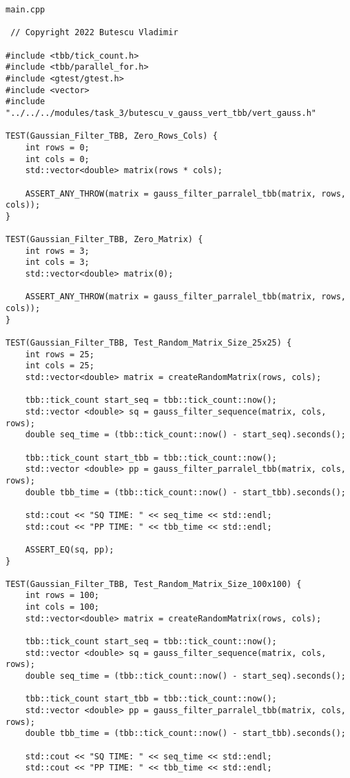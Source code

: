 \documentclass{report}
\begin{document}
\begin{lstlisting}
main.cpp

 // Copyright 2022 Butescu Vladimir

#include <tbb/tick_count.h>
#include <tbb/parallel_for.h>
#include <gtest/gtest.h>
#include <vector>
#include "../../../modules/task_3/butescu_v_gauss_vert_tbb/vert_gauss.h"

TEST(Gaussian_Filter_TBB, Zero_Rows_Cols) {
    int rows = 0;
    int cols = 0;
    std::vector<double> matrix(rows * cols);

    ASSERT_ANY_THROW(matrix = gauss_filter_parralel_tbb(matrix, rows, cols));
}

TEST(Gaussian_Filter_TBB, Zero_Matrix) {
    int rows = 3;
    int cols = 3;
    std::vector<double> matrix(0);

    ASSERT_ANY_THROW(matrix = gauss_filter_parralel_tbb(matrix, rows, cols));
}

TEST(Gaussian_Filter_TBB, Test_Random_Matrix_Size_25x25) {
    int rows = 25;
    int cols = 25;
    std::vector<double> matrix = createRandomMatrix(rows, cols);

    tbb::tick_count start_seq = tbb::tick_count::now();
    std::vector <double> sq = gauss_filter_sequence(matrix, cols, rows);
    double seq_time = (tbb::tick_count::now() - start_seq).seconds();

    tbb::tick_count start_tbb = tbb::tick_count::now();
    std::vector <double> pp = gauss_filter_parralel_tbb(matrix, cols, rows);
    double tbb_time = (tbb::tick_count::now() - start_tbb).seconds();

    std::cout << "SQ TIME: " << seq_time << std::endl;
    std::cout << "PP TIME: " << tbb_time << std::endl;

    ASSERT_EQ(sq, pp);
}

TEST(Gaussian_Filter_TBB, Test_Random_Matrix_Size_100x100) {
    int rows = 100;
    int cols = 100;
    std::vector<double> matrix = createRandomMatrix(rows, cols);

    tbb::tick_count start_seq = tbb::tick_count::now();
    std::vector <double> sq = gauss_filter_sequence(matrix, cols, rows);
    double seq_time = (tbb::tick_count::now() - start_seq).seconds();

    tbb::tick_count start_tbb = tbb::tick_count::now();
    std::vector <double> pp = gauss_filter_parralel_tbb(matrix, cols, rows);
    double tbb_time = (tbb::tick_count::now() - start_tbb).seconds();

    std::cout << "SQ TIME: " << seq_time << std::endl;
    std::cout << "PP TIME: " << tbb_time << std::endl;


\end{lstlisting}
\end{document}
